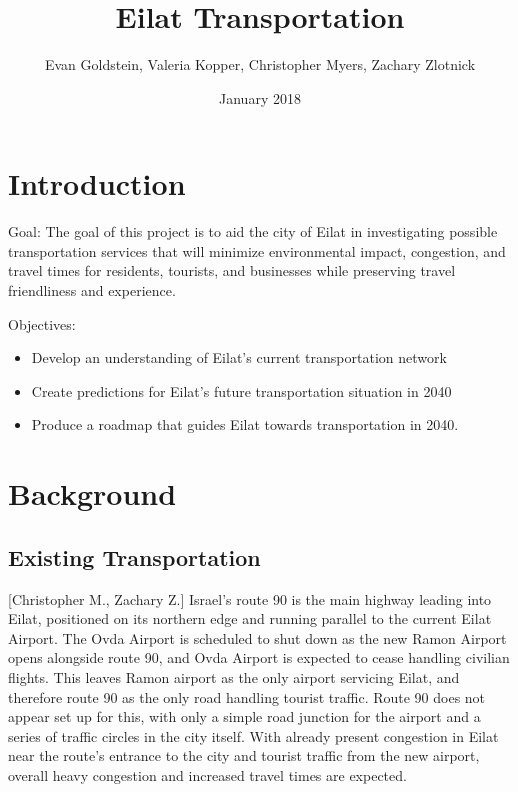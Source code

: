 \documentclass[12pt]{article}                         %
\title{Eilat Transportation}
\author{Evan Goldstein, Valeria Kopper, Christopher Myers, Zachary Zlotnick}
\date{January 2018}
\begin{document}
\maketitle
\newpage

\renewcommand\abstractname{Summary} %

\tableofcontents
\newpage
\listofauthorships
\newpage
{}
\doublespacing

\section{Introduction}

Goal: The goal of this project is to aid the city of Eilat in investigating possible transportation services that will minimize environmental impact, congestion, and travel times for residents, tourists, and businesses while preserving travel friendliness and experience.

Objectives:
\begin{itemize}
    \item Develop an understanding of Eilat's current transportation network
    
    \item Create predictions for Eilat's future transportation situation in 2040
    
    \item Produce a roadmap that guides Eilat towards transportation in 2040.
\end{itemize}

\newpage
\section{Background}

\subsection{Existing Transportation}[Christopher M., Zachary Z.]
Israel's route 90 is the main highway leading into Eilat, positioned on its northern edge and running parallel to the current Eilat Airport. The Ovda Airport is scheduled to shut down as the new Ramon Airport opens alongside route 90, and Ovda Airport is expected to cease handling civilian flights. This leaves Ramon airport as the only airport servicing Eilat, and therefore route 90 as the only road handling tourist traffic. Route 90 does not appear set up for this, with only a simple road junction for the airport and a series of traffic circles in the city itself. With already present congestion in Eilat near the route's entrance to the city and tourist traffic from the new airport, overall heavy congestion and increased travel times are expected.
\end{document}
